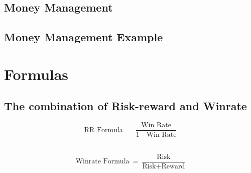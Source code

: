 \documentclass[10pt] {article}
\begin{document}
\subsection{Money Management}
\subsection{Money Management Example}

\newpage
\section{Formulas}

\subsection{The combination of Risk-reward and Winrate} \vspace{0.8cm}

\[ \text{RR Formula}\ =\ \frac{\text{Win Rate}}{\text{1}\text{ - Win Rate}} \] \

\[ \text{Winrate Formula}\ =\ \frac{\text{Risk}}{\text{Risk} + \text{Reward}}\] \

 
\end{document}
